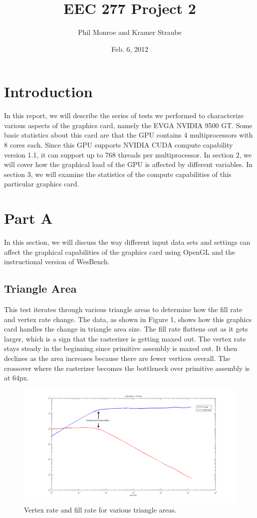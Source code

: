 \documentclass[12pt] {article}
\begin{document}
\title{EEC 277 Project 2}
\author{Phil Monroe and Kramer Straube}
\date{Feb. 6, 2012}
\maketitle

\section {Introduction}
In this report, we will describe the series of tests we performed to characterize various aspects of the graphics card, namely the EVGA NVIDIA 9500 GT. Some basic statistics about this card are that the GPU contains 4 multiprocessors with 8 cores each. Since this GPU supports NVIDIA CUDA compute capability version 1.1, it can support up to 768 threads per multiprocessor. In section 2, we will cover how the graphical load of the GPU is affected by different variables. In section 3, we will examine the statistics of the compute capabilities of this particular graphics card.

\newpage
\section{Part A}
In this section, we will discuss the way different input data sets and settings can affect the graphical capabilities of the graphics card using OpenGL and the instructional version of WesBench.
\subsection{Triangle Area}
This test iterates through various triangle areas to determine how the fill rate and vertex rate change. The data, as shown in Figure 1, shows how this graphics card handles the change in triangle area size. The fill rate flattens out as it gets larger, which is a sign that the rasterizer is getting maxed out. The vertex rate stays steady in the beginning since primitive assembly is maxed out. It then declines as the area increases because there are fewer vertices overall. The crossover where the rasterizer becomes the bottleneck over primitive assembly is at 64px.
\begin{figure}[ht!]
	\centering
	\includegraphics[width=5in]{figures/results1.png}
	\caption{Vertex rate and fill rate for various triangle areas.}
\end{figure}
\FloatBarrier
\end{document}
